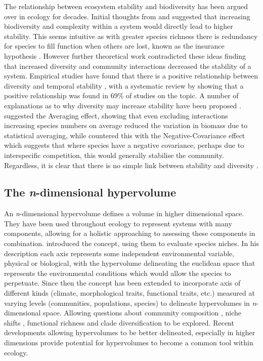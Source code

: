 The relationship between ecosystem stability and biodiversity has been argued over in ecology for decades. Initial thoughts from  \cite{MacArthur1955} and \cite{Elton1958} suggested that increasing biodiversity and complexity within a system would directly lead to higher stability. This seems intuitive as with greater species richness there is redundancy for species to fill function when others are lost, known as the insurance hypothesis \citep{Yachi1999}. However further theoretical work contradicted these ideas \citep{May1973} finding that increased diversity and community interactions decreased the stability of a system. Empirical studies have found that there is a positive relationship between diversity and temporal stability \citep{Tilman1994, Tilman2006}, with a systematic review by \cite{Ives2007} showing that a positive relationship was found in 69\% of studies on the topic. A number of explanations as to why diversity may increase stability have been proposed \citep{McCann2000}. \cite{Doak1998} suggested the Averaging effect, showing that even excluding interactions increasing species numbers on average reduced the variation in biomass due to statistical averaging, while \cite{Tilman1998} countered this with the Negative-Covariance effect which suggests that where species have a negative covariance, perhaps due to interspecific competition, this would generally stabilise the community. Regardless, it is clear that there is no simple link between stability and diversity \citep{Goodman1975}.


\subsection{The \emph{n}-dimensional hypervolume}

An \emph{n}-dimensional hypervolume defines a volume in higher dimensional space. They have been used throughout ecology to represent systems with many components, allowing for a holistic approaching to assessing these components in combination.  \cite{Hutchinson1957} introduced the concept, using them to evaluate species niches. In his description each axis represents some independent environmental variable, physical or biological, with the hypervolume delineating the euclidean space that represents the environmental conditions which would allow the species to perpetuate. Since then the concept has been extended to incorporate axis of different kinds (climate, morphological traits, functional traits, etc.) measured at varying levels (communities, populations, species) to delineate hypervolumes in \emph{n}-dimensional space. Allowing questions about community composition \citep{Barros2016}, niche shifts \citep{Jackson2000, Evans2009, Tingley2014, Blonder2015}, functional richness \citep{Lamanna2014} and clade diversification \citep{Sidlauskas2008} to be explored. Recent developments allowing hypervolumes to be better delineated, especially in higher dimensions \citep{Blonder2014, Junker2016, Blonder2017b} provide potential for hypervolumes to become a common tool within ecology.


